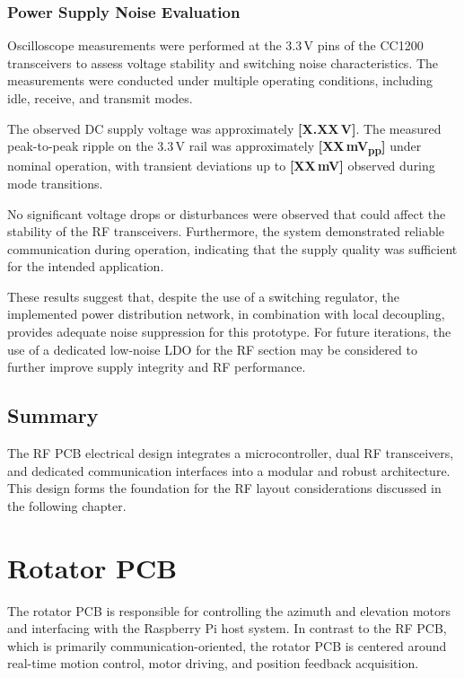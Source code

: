 \subsubsection{Power Supply Noise Evaluation}
\label{subsubsec:rf_power_measurement}

Oscilloscope measurements were performed at the 3.3\,V pins of the CC1200 transceivers to assess voltage stability and switching noise characteristics. The measurements were conducted under multiple operating conditions, including idle, receive, and transmit modes.

The observed DC supply voltage was approximately \textbf{[X.XX\,V]}. The measured peak-to-peak ripple on the 3.3\,V rail was approximately \textbf{[XX\,mV\textsubscript{pp}]} under nominal operation, with transient deviations up to \textbf{[XX\,mV]} observed during mode transitions.

No significant voltage drops or disturbances were observed that could affect the stability of the RF transceivers. Furthermore, the system demonstrated reliable communication during operation, indicating that the supply quality was sufficient for the intended application.

These results suggest that, despite the use of a switching regulator, the implemented power distribution network, in combination with local decoupling, provides adequate noise suppression for this prototype. For future iterations, the use of a dedicated low-noise LDO for the RF section may be considered to further improve supply integrity and RF performance.

\subsection{Summary}
\label{subsec:rf_summary}

The RF PCB electrical design integrates a microcontroller, dual RF transceivers, and dedicated communication interfaces into a modular and robust architecture. This design forms the foundation for the RF layout considerations discussed in the following chapter.

\section{Rotator PCB}
\label{sec:rotator_pcb}

The rotator PCB is responsible for controlling the azimuth and elevation motors and interfacing with the Raspberry Pi host system. In contrast to the RF PCB, which is primarily communication-oriented, the rotator PCB is centered around real-time motion control, motor driving, and position feedback acquisition.


